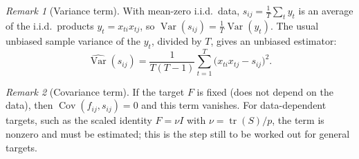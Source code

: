 \documentclass[11pt]{article}
\theoremstyle{remark}
\newtheorem*{remark}{Remark}
\newcommand{\Var}{\operatorname{Var}}
\newcommand{\Cov}{\operatorname{Cov}}
\newcommand{\tr}{\operatorname{tr}}
\begin{document}
\begin{remark}[Variance term]
With mean-zero i.i.d.\ data, $s_{ij} = \frac1T\sum_t y_t$ is an average of the
i.i.d.\ products $y_t = x_{ti}x_{tj}$, so
$\Var(s_{ij}) = \frac1T\Var(y_t)$. The usual unbiased sample variance of the
$y_t$, divided by $T$, gives an unbiased estimator:
\[
\widehat{\Var}(s_{ij}) = \frac{1}{T(T-1)}\sum_{t=1}^T \bigl(x_{ti}x_{tj} - s_{ij}\bigr)^2 .
\]
\end{remark}

\begin{remark}[Covariance term]
If the target $F$ is fixed (does not depend on the data), then
$\Cov(f_{ij}, s_{ij}) = 0$ and this term vanishes. For data-dependent targets,
such as the scaled identity $F = \nu I$ with $\nu = \tr(S)/p$, the term is
nonzero and must be estimated; this is the step still to be worked out for
general targets.
\end{remark}
\end{document}
